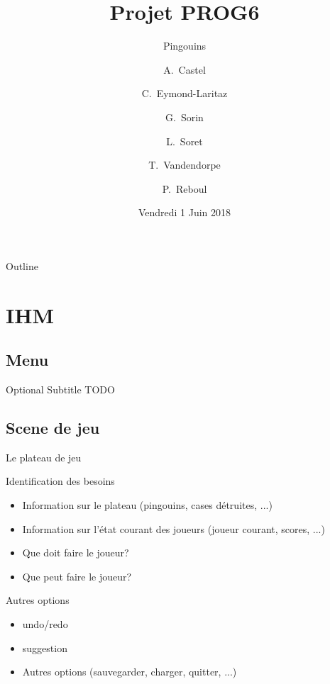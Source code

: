 \documentclass{beamer}
\title{Projet PROG6}
\subtitle{Pingouins}
\author{A.~Castel \and C.~Eymond-Laritaz \and G.~Sorin \and L.~Soret \and T.~Vandendorpe \and P.~Reboul}
\institute[Université Grenoble-Alpes] %
{
  UFR IM²AG\\
  Université Grenoble-Alpes
}
\date{Vendredi 1 Juin 2018}
\begin{document}
\begin{frame}
  \titlepage
\end{frame}

\begin{frame}{Outline}
  \tableofcontents
\end{frame}

\section{IHM}

\subsection{Menu}

\begin{frame}{}{Optional Subtitle}
TODO
\end{frame}

\subsection{Scene de jeu}

\begin{frame}{Le plateau de jeu}
  \begin{block}{Identification des besoins}
    \begin{itemize}
    \item <1-> Information sur le plateau (pingouins, cases détruites, ...)
    \item <2-> Information sur l'état courant des joueurs (joueur courant, scores, ...)
    \item <3-> Que doit faire le joueur?
    \item <4-> Que peut faire le joueur?
    \end{itemize}
  \end{block}
\end{frame}

\begin{frame}{}
  \begin{block}{Autres options}
    \begin{itemize}
    \item <1-> undo/redo
    \item <2-> suggestion
    \item <3-> Autres options (sauvegarder, charger, quitter, ...)
    \end{itemize}
  \end{block}
\end{frame}
\end{document}
